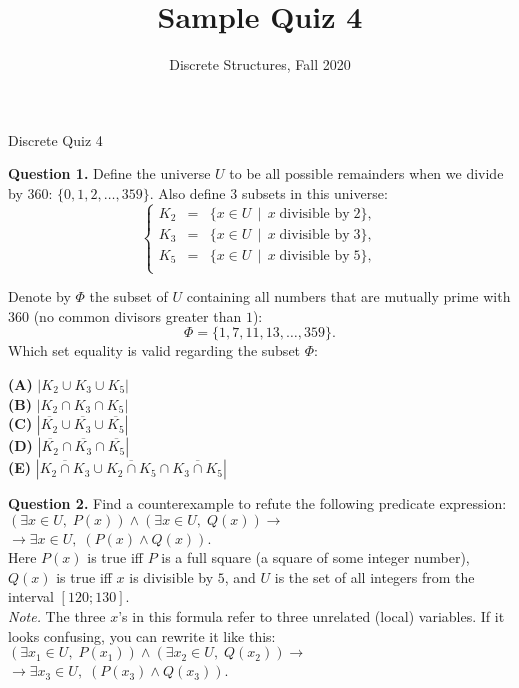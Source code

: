 \documentclass[jou]{apa6}
\title{Sample Quiz 4}
\author{Discrete Structures, Fall 2020}
\affiliation{RBS}
\begin{document}
\thispagestyle{empty}

\twocolumn
{\Large Discrete Quiz 4}

\vspace{10pt}
{\bf Question 1.} Define the universe $U$ to be all possible remainders 
when we divide by $360$: $\{ 0, 1, 2, \ldots, 359 \}$. 
Also define $3$ subsets in this universe: 
$$\left\{ \begin{array}{rcl}
K_2 & = & \{ x \in U \,\mid\, x\;\text{divisible by}\;2 \},\\
K_3 & = & \{ x \in U \,\mid\, x\;\text{divisible by}\;3 \},\\
K_5 & = & \{ x \in U \,\mid\, x\;\text{divisible by}\;5 \},\\
\end{array} \right.$$

Denote by $\Phi$ the subset of $U$ containing all numbers
that are mutually prime with $360$ (no common divisors greater than $1$):
$$\Phi = \{1,7,11,13,\ldots,359\}.$$
Which set equality is valid regarding the subset $\Phi$:

{\large
\noindent
{\bf (A)} $\left| K_2 \cup K_3 \cup K_5 \right|$\\
{\bf (B)} $\left| K_2 \cap K_3 \cap K_5 \right|$\\
{\bf (C)} $\left| \overline{K_2} \cup \overline{K_3} \cup \overline{K_5} \right|$\\
{\bf (D)} $\left| \overline{K_2} \cap \overline{K_3} \cap \overline{K_5} \right|$\\
{\bf (E)} $\left| \overline{K_2 \cap K_3} \cup \overline{K_2 \cap K_5} \cap \overline{K_3 \cap K_5} \right|$
}

\vspace{6pt}
{\bf Question 2.}
Find a counterexample to refute the following predicate expression:\\
$(\exists x \in U,\;P(x)) \wedge (\exists x\in U,\;Q(x)) \rightarrow$\\
$\rightarrow \exists x\in U,\;(P(x) \wedge Q(x))$.\\
Here $P(x)$ is true iff $P$ is a full square (a square of some integer number), 
$Q(x)$ is true iff $x$ is divisible by $5$, and $U$ is the set of all integers 
from the interval $[120;130]$.\\
{\em Note.} The three $x$'s in this formula refer to 
three unrelated (local) variables. 
If it looks confusing, you can rewrite it like this:\\
$(\exists x_1 \in U,\;P(x_1)) \wedge (\exists x_2\in U,\;Q(x_2)) \rightarrow$\\
$\rightarrow \exists x_3\in U,\;(P(x_3) \wedge Q(x_3))$.
\end{document}
